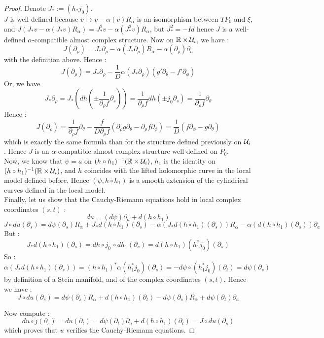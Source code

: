 \documentclass[../main.tex]{subfiles}
\begin{document}
\begin{proof}

Denote $J_* := (h_*j_0)$.\\
$J$ is well-defined because $v\mapsto v-\alpha(v)R_\alpha$ is an isomorphism between $TP_0$ and $\xi$, and $J(J_*v - \alpha(J_*v)R_\alpha) = J_*^2v - \alpha(J_*^2v)R_\alpha$, but $J_*^2 = -Id$ hence $J$ is a well-defined $\alpha$-compatible almost complex structure. Now on $\mathbb{R}\times \mathcal{U}_i$, we have : $$J(\partial_\rho) = J_*\partial_\rho - \alpha(J_*\partial_\rho)R_\alpha - \alpha(\partial_\rho)\partial_a$$ with the definition above. Hence : $$J(\partial_\rho) = J_*\partial_\rho - \frac{1}{D}\alpha(J_*\partial_\rho)(g'\partial_\theta - f'\partial_\phi)$$
Or, we have $$J_* \partial_\rho = J_*(dh(\pm\frac{1}{\partial_\rho f}\partial_s)) = \frac{1}{\partial_\rho f}dh(\pm j_0\partial_s) = \frac{1}{\partial_\rho f}\partial_\theta$$
Hence :
$$J(\partial_\rho) = \frac{1}{\partial_\rho f}\partial_\theta - \frac{f}{D\partial_\rho f} (\partial_\rho g \partial_\theta - \partial_\rho f\partial_\phi) = \frac{1}{D}(f\partial_\phi- g\partial_\theta)$$
which is exactly the same formula than for the structure defined previously on $\mathcal{U}_i$. Hence $J$ is an $\alpha$-compatible almost complex structure well-defined on $P_0$. \\
Now, we know that $\psi = a$ on $(h\circ h_1)^{-1}(\mathbb{R}\times \mathcal{U}_i)$, $h_1$ is the identity on $(h\circ h_1)^{-1}(\mathbb{R}\times \mathcal{U}_i)$, and $h$ coincides with the lifted holomorphic curve in the local model defined before. Hence $(\psi,h\circ h_1)$ is a smooth extension of the cylindrical curves defined in the local model. \\

Finally, let us show that the Cauchy-Riemann equations hold in local complex coordinates $(s,t)$ : 
$$du = (d\psi)\partial_a + d(h\circ h_1)$$
$$J\circ du(\partial_s) = d\psi(\partial_s)R_\alpha + J_*d(h\circ h_1)(\partial_s) - \alpha(J_*d(h\circ h_1)(\partial_s))R_\alpha - \alpha(d(h\circ h_1)(\partial_s))\partial_a$$
But :
$$J_*d(h\circ h_1)(\partial_s) = dh\circ j_0\,\circ dh_1(\partial_s) = d(h\circ h_1)(h_1^*j_0)(\partial_s)$$
So :
$$\alpha(J_* d(h\circ h_1)(\partial_s)) = (h\circ h_1)^*\alpha(h_1^*j_0)(\partial_s) = -d\psi\circ (h_1^*j_0)(\partial_t) = d\psi(\partial_s)$$
by definition of a Stein manifold, and of the complex coordinates $(s,t)$. Hence we have :
$$J\circ du(\partial_s) = d\psi(\partial_s)R_\alpha + d(h\circ h_1)(\partial_t) -d\psi(\partial_s)R_\alpha + d\psi(\partial_t)\partial_a $$

Now compute :
$$du\circ j(\partial_s) = du(\partial_t) = d\psi(\partial_t)\partial_a + d(h\circ h_1)(\partial_t) = J\circ du(\partial_s)$$
which proves that $u$ verifies the Cauchy-Riemann equations.

\end{proof}
\end{document}
